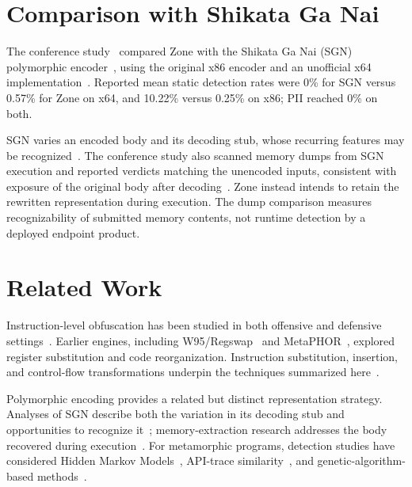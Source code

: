 \documentclass[runningheads]{llncs}
\begin{document}
\section{Comparison with Shikata Ga Nai}\label{sec:comparison}
The conference study~\cite{zone_secrypt_2026} compared Zone with the
Shikata Ga Nai (SGN) polymorphic encoder~\cite{sgnarticle}, using the
original x86 encoder and an unofficial x64 implementation~\cite{sgn64}.
Reported mean static detection rates were 0\% for SGN versus 0.57\% for
Zone on x64, and 10.22\% versus 0.25\% on x86; PII reached 0\% on both.

SGN varies an encoded body and its decoding stub, whose recurring
features may be recognized~\cite{sgnstrong}. The conference study also
scanned memory dumps from SGN execution and reported verdicts matching
the unencoded inputs, consistent with exposure of the original body after
decoding~\cite{codeExtraction}. Zone instead intends to retain the
rewritten representation during execution. The dump comparison measures
recognizability of submitted memory contents, not runtime detection by
a deployed endpoint product.








\section{Related Work}\label{sect:related_work}
Instruction-level obfuscation has been studied in both offensive and defensive settings~\cite{survey1,survey2}. Earlier engines, including W95/Regswap~\cite{desai2010highly} and MetaPHOR~\cite{MetaPHOR}, explored register substitution and code reorganization. Instruction substitution, insertion, and control-flow transformations underpin the techniques summarized here~\cite{desai2008towards,desai2010highly,szor2001hunting,bin2binobf,llvmobf}.

Polymorphic encoding provides a related but distinct representation strategy. Analyses of SGN describe both the variation in its decoding stub and opportunities to recognize it~\cite{sgn64,sgnstrong}; memory-extraction research addresses the body recovered during execution~\cite{codeExtraction}. For metamorphic programs, detection studies have considered Hidden Markov Models~\cite{wong2006hunting,desai2010highly}, API-trace similarity~\cite{identifyingmeth}, and genetic-algorithm-based methods~\cite{methgenetic}.
\end{document}
